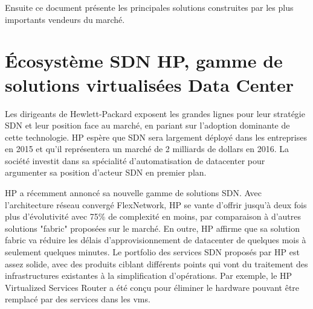 Ensuite ce document présente les principales solutions construites par les plus importants vendeurs du marché.



\section{Écosystème SDN HP, gamme de solutions virtualisées Data Center}


Les dirigeants de Hewlett-Packard exposent les grandes lignes pour leur stratégie SDN et leur position face au marché, en pariant sur l'adoption dominante de cette technologie. HP espère que SDN sera largement déployé dans les entreprises en 2015 et qu'il représentera un marché de 2 milliards de dollars en 2016. La société investit dans sa spécialité d'automatisation de \gls{datacenter} pour argumenter sa position d'acteur SDN en premier plan. \cite{ExecutiveGuideToSDNHP}


HP a récemment annoncé sa nouvelle gamme de solutions SDN. Avec l'architecture réseau convergé FlexNetwork, HP se vante d'offrir jusqu'à deux fois plus d'évolutivité avec 75\% de complexité en moins, par comparaison à d'autres solutions "fabric" proposées sur le marché. En outre, HP affirme que sa solution \gls{fabric} va réduire les délais d’approvisionnement de \gls{datacenter} de quelques mois à seulement quelques minutes. Le portfolio des services SDN proposés par HP est assez solide, avec des produits ciblant différents points qui vont du traitement des infrastructures existantes à la simplification d'opérations. Par exemple, le HP Virtualized Services Router a été conçu pour éliminer le hardware pouvant être remplacé par des services dans les \glspl{vm}.  



